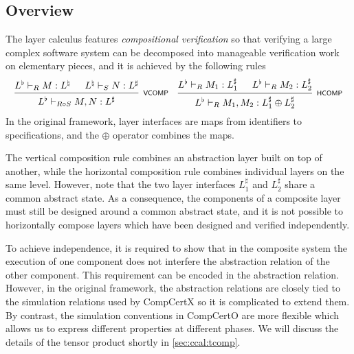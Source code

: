 \documentclass[acmsmall,review,anonymous]{acmart}\settopmatter{printfolios=true,printccs=false,printacmref=false}
\begin{document}


\subsection{Overview} %


The layer calculus features \emph{compositional verification}
so that verifying a large complex software system
can be decomposed into
manageable verification work
on elementary pieces,
and it is achieved by the following rules
\[
  \begin{prooftree}
    \hypo{L^\flat \vdash_R M : L^\natural}
    \hypo{L^\natural \vdash_S N : L^\sharp}
    \infer2[\scriptsize\kw{VCOMP}]{L^\flat \vdash_{R \circ S} M, N : L^\sharp}
  \end{prooftree}
  \quad
  \begin{prooftree}
    \hypo{L^\flat \vdash_R M_1 : L_1^\sharp}
    \hypo{L^\flat \vdash_R M_2 : L_2^\sharp}
    \infer2[\scriptsize\kw{HCOMP}]{L^\flat \vdash_R M_1, M_2 :
      L_1^\sharp \oplus L_2^\sharp}
  \end{prooftree}
\]
In the original framework,
layer interfaces are maps from identifiers to
specifications,
and the $\oplus$ operator combines the maps.

The vertical composition rule
combines an abstraction layer built on top of another,
while the horizontal composition rule combines
individual layers on the same level.
However, note that the two layer interfaces
$L_1^\sharp$ and $L_2^\sharp$
share a common abstract state.
As a consequence, 
the components of a composite layer
must still be designed around a common abstract state,
and it is not possible to horizontally compose layers
which have been designed and verified independently.

To achieve independence,
it is required to show that
in the composite system
the execution of one component
does not interfere the abstraction relation
of the other component.
This requirement can be encoded
in the abstraction relation.
However,
in the original framework,
the abstraction relations
are closely tied to
the simulation relations used by CompCertX
so it is complicated to extend them.
By contrast,
the simulation conventions in CompCertO
are more flexible
which allows us to express
different properties at different phases.
We will discuss the details of the tensor product
shortly in \ref{sec:ccal:tcomp}.
\end{document}
